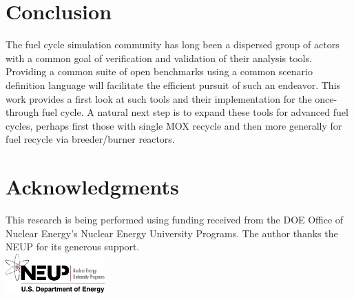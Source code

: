 \documentclass{anstrans}
\begin{document}
\section{Conclusion}
The fuel cycle simulation community has long been a dispersed group of actors
with a common goal of verification and validation of their analysis
tools. Providing a common suite of open benchmarks using a common scenario
definition language will facilitate the efficient pursuit of such an
endeavor. This work provides a first look at such tools and their implementation
for the once-through fuel cycle. A natural next step is to expand these tools
for advanced fuel cycles, perhaps first those with single MOX recycle and then
more generally for fuel recycle via breeder/burner reactors.

\section{Acknowledgments}
This research is being performed using funding received from the DOE Office of
Nuclear Energy's Nuclear Energy University Programs.  The author thanks the NEUP
for its generous support.\\ 
\includegraphics[width=1.5in]{neup_logo_large.jpg}


\end{document}
